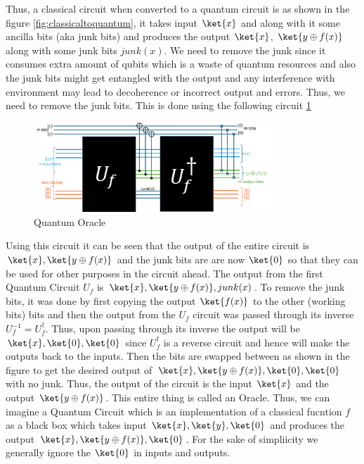 \documentclass[12pt, oneside]{book}
\theoremstyle{definition}
\theoremstyle{definition}
\theoremstyle{remark}
\begin{document}
Thus, a classical circuit when converted to a quantum circuit is as shown in the figure \ref{fig:classicaltoquantum}, it takes input $\ket{x}$ and along with it 
some ancilla bits (aka junk bits) and produces the output $\ket{x}$, $\ket{y \oplus f(x)}$ along with some junk bits $junk(x)$. We need to remove the junk since it consumes extra amount of qubits which is a waste of quantum resources and 
also the junk bits might get entangled with the output and any interference with environment may lead to decoherence or incorrect output and errors. Thus, we need to remove the junk bits.
This is done using the following circuit \ref{fig:quantumoracle}
\begin{figure}[H]
    \centering
    \includegraphics[width=0.8\textwidth]{../images/quantumoracle.png}
    \caption{Quantum Oracle}
    \label{fig:quantumoracle}
\end{figure}
Using this circuit it can be seen that the output of the entire circuit is $\ket{x},\ket{y\oplus f(x)}$ and the junk bits are are now $\ket{0}$ so that they can be used for other purposes in the circuit ahead. 
The output from the first Quantum Circuit $U_f$ is $\ket{x},\ket{y\oplus f(x)},junk(x)$. To remove the junk bits, it was done by first copying the output $\ket{f(x)}$ to the other (working bits) bits and then the output from the $U_f$ circuit was passed through its inverse $U_f^{-1}=U^{\dagger}_f$. Thus, upon passing through its inverse the output will be $\ket{x},\ket{0},\ket{0}$ since $U_f^{\dagger}$ is a reverse circuit and hence will make the outputs back to the inputs. 
Then the bits are swapped between as shown in the figure to get the desired output of 
$\ket{x},\ket{y\oplus f(x)},\ket{0},\ket{0}$ with no junk. Thus, the output of the circuit is the input $\ket{x}$ and the output $\ket{y\oplus f(x)}$. This entire thing is called an Oracle. 
Thus, we can imagine a Quantum Circuit which is an implementation of a classical fucntion $f$ as a black box which takes input $\ket{x}, \ket{y},\ket{0}$ and produces the output $\ket{x},\ket{y\oplus f(x)},\ket{0}$. 
For the sake of simpliicity we generally ignore the $\ket{0}$ in inputs and outputs. 
\end{document}
